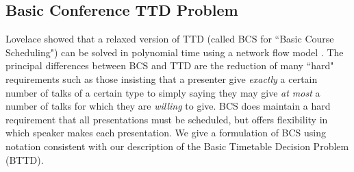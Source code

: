 \documentclass[]{article}
\theoremstyle{definition}
\theoremstyle{remark}
\numberwithin{equation}{section}
\begin{document}
\subsection{Basic Conference TTD Problem}
Lovelace showed that a relaxed version of TTD (called BCS for ``Basic Course Scheduling") can be solved in polynomial time using a network flow model \cite{lovelace2010}. 
The principal differences between BCS and TTD are the reduction of many ``hard" requirements such as those insisting that a presenter give \emph{exactly} a certain number of talks of a certain type to simply saying they may give \emph{at most} a number of talks for which they are \emph{willing} to give. 
BCS does maintain a hard requirement that all presentations must be scheduled, but offers flexibility in which speaker makes each presentation.
We give a formulation of BCS using notation consistent with our description of the Basic Timetable Decision Problem (BTTD).
\end{document}
